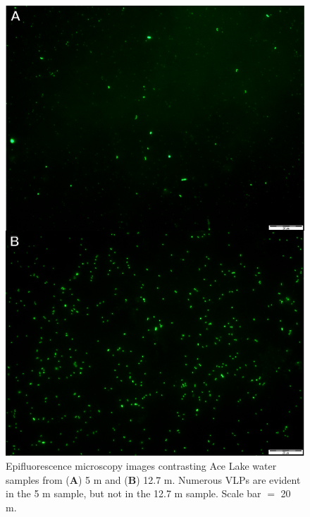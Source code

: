 \begin{figure}
\includegraphics[width=\textwidth]{ace_figures/virus_compare.pdf}
\caption[Lack of \acs{VLP} in 5 m and 12.7 m Ace Lake samples]{Epifluorescence microscopy images contrasting Ace Lake water samples from (\textbf{A}) 5 m and (\textbf{B}) 12.7 m. 
Numerous \acp{VLP} are evident in the 5 m sample, but not in the 12.7 m sample. Scale bar $=$ 20 \textmu{}m.
}
\label{fig:virus_compare}

\end{figure}
